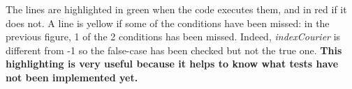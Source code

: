 The lines are highlighted in green when the code executes them, and in red if it does not. A line is yellow if some of the conditions have been missed: in the previous figure, 1 of the 2 conditions has been missed. Indeed, \textit{indexCourier} is different from -1 so the false-case has been checked but not the true one. \textbf{This highlighting is very useful because it helps to know what tests have not been implemented yet.}